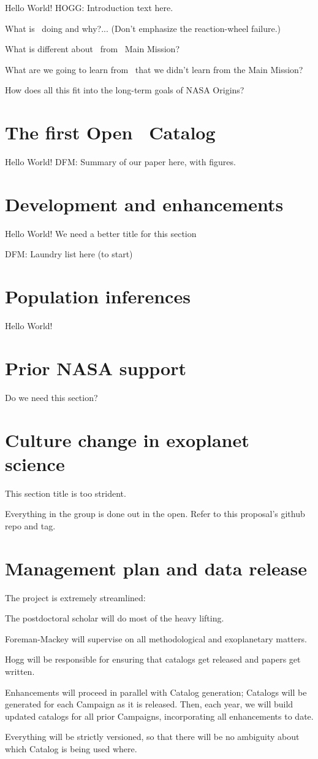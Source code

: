 \documentclass[12pt]{article}
\begin{document}
Hello World!  HOGG:  Introduction text here.

What is \ketu\ doing and why?... (Don't emphasize the reaction-wheel failure.)

What is different about \ketu\ from \kepler\ Main Mission?

What are we going to learn from \ketu\ that we didn't learn from the Main Mission?

How does all this fit into the long-term goals of NASA Origins?

\section{The first Open \ketu\ Catalog}

Hello World!  DFM:  Summary of our paper here, with figures.

\section{Development and enhancements}

Hello World!  We need a better title for this section

DFM:  Laundry list here (to start)

\section{Population inferences}

Hello World!

\section{Prior NASA support}

Do we need this section?

\section{Culture change in exoplanet science}

This section title is too strident.

Everything in the group is done out in the open.
Refer to this proposal's github repo and tag.

\section{Management plan and data release}

The project is extremely streamlined:

The postdoctoral scholar will do most of the heavy lifting.

Foreman-Mackey will supervise on all methodological and exoplanetary
matters.

Hogg will be responsible for ensuring that catalogs get released and
papers get written.

Enhancements will proceed in parallel with Catalog generation;
Catalogs will be generated for each Campaign as it is released.
Then, each year, we will build updated catalogs for all prior
Campaigns, incorporating all enhancements to date.

Everything will be strictly versioned, so that there will be no
ambiguity about which Catalog is being used where.
\end{document}
